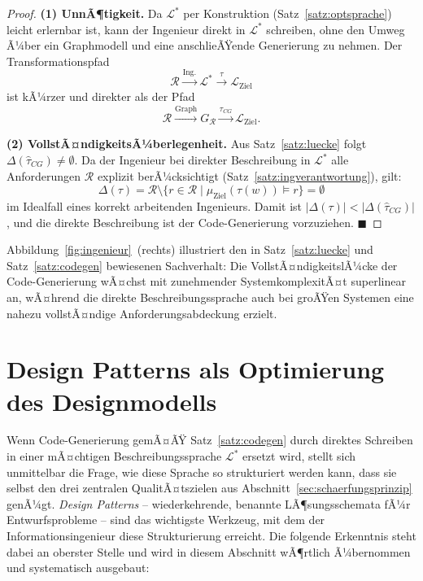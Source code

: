 ﻿\documentclass[a4paper,12pt]{report}
\theoremstyle{definition}
\begin{document}
\begin{proof}
\textbf{(1) UnnÃ¶tigkeit.}
Da $\mathcal{L}^*$ per Konstruktion (Satz~\ref{satz:optsprache}) leicht erlernbar ist,
kann der Ingenieur direkt in $\mathcal{L}^*$ schreiben, ohne den Umweg Ã¼ber ein
Graphmodell und eine anschlieÃŸende Generierung zu nehmen. Der Transformationspfad
\[
  \mathcal{R} \xrightarrow{\text{Ing.}} \mathcal{L}^* \xrightarrow{\tau} \mathcal{L}_{\text{Ziel}}
\]
ist kÃ¼rzer und direkter als der Pfad
\[
  \mathcal{R} \xrightarrow{\text{Graph}} G_\mathcal{R} \xrightarrow{\hat{\tau}_{CG}} \mathcal{L}_{\text{Ziel}}.
\]

\textbf{(2) VollstÃ¤ndigkeitsÃ¼berlegenheit.}
Aus Satz~\ref{satz:luecke} folgt $\Delta(\hat{\tau}_{CG}) \neq \emptyset$.
Da der Ingenieur bei direkter Beschreibung in $\mathcal{L}^*$ alle Anforderungen
$\mathcal{R}$ explizit berÃ¼cksichtigt (Satz~\ref{satz:ingverantwortung}), gilt:
\[
  \Delta(\tau) = \mathcal{R} \setminus \{r \in \mathcal{R} \mid \mu_{\text{Ziel}}(\tau(w)) \models r\}
  = \emptyset
\]
im Idealfall eines korrekt arbeitenden Ingenieurs.
Damit ist $|\Delta(\tau)| < |\Delta(\hat{\tau}_{CG})|$, und die direkte Beschreibung
ist der Code-Generierung vorzuziehen. $\blacksquare$
\end{proof}

Abbildung~\ref{fig:ingenieur}~(rechts) illustriert den in Satz~\ref{satz:luecke} und
Satz~\ref{satz:codegen} bewiesenen Sachverhalt: Die VollstÃ¤ndigkeitslÃ¼cke der
Code-Generierung wÃ¤chst mit zunehmender SystemkomplexitÃ¤t superlinear an, wÃ¤hrend
die direkte Beschreibungssprache auch bei groÃŸen Systemen eine nahezu vollstÃ¤ndige
Anforderungsabdeckung erzielt.

\section{Design Patterns als Optimierung des Designmodells}
\label{sec:design-patterns}

Wenn Code-Generierung gemÃ¤ÃŸ Satz~\ref{satz:codegen} durch direktes Schreiben in
einer mÃ¤chtigen Beschreibungssprache $\mathcal{L}^*$ ersetzt wird, stellt sich
unmittelbar die Frage, wie diese Sprache so strukturiert werden kann, dass sie
selbst den drei zentralen QualitÃ¤tszielen aus Abschnitt~\ref{sec:schaerfungsprinzip}
genÃ¼gt. \emph{Design Patterns} -- wiederkehrende, benannte LÃ¶sungsschemata fÃ¼r
Entwurfsprobleme -- sind das wichtigste Werkzeug, mit dem der Informationsingenieur
diese Strukturierung erreicht. Die folgende Erkenntnis steht dabei an oberster
Stelle und wird in diesem Abschnitt wÃ¶rtlich Ã¼bernommen und systematisch ausgebaut:
\end{document}
